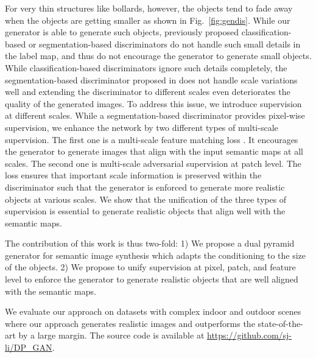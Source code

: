 \documentclass{bmvc2k}
\newcommand{\figref}[1]{Fig.~\ref{#1}}
\begin{document}
For very thin structures like bollards, however, the objects tend to fade away when the objects are getting smaller as shown in \figref{fig:gendis}. While our generator is able to generate such objects, previously proposed classification-based \cite{park2019semantic} or segmentation-based \cite{schonfeld_sushko_iclr2021} discriminators do not handle such small details in the label map, and thus do not encourage the generator to generate small objects. While classification-based discriminators ignore such details completely, the segmentation-based discriminator proposed in \cite{schonfeld_sushko_iclr2021} does not handle scale variations well and extending the discriminator to different scales even deteriorates the quality of the generated images. 
To address this issue, we introduce supervision at different scales. 
While a segmentation-based discriminator provides pixel-wise supervision, we enhance the network by two different types of multi-scale supervision. 
The first one is a multi-scale feature matching loss \cite{johnson2016perceptual}. It encourages the generator to generate images that align with the input semantic maps at all scales.
The second one is multi-scale adversarial supervision at patch level.
The loss ensures that important scale information is preserved  within the discriminator such that the generator is enforced to generate more realistic objects at various scales. 
We show that the unification of the three types of supervision is essential to generate realistic objects that align well with the semantic maps.


The contribution of this work is thus two-fold:
1) We propose a dual pyramid generator for semantic image synthesis which adapts the conditioning to the size of the objects. 
2) We propose to unify supervision at pixel, patch, and feature level to enforce the generator to generate realistic objects that are well aligned with the semantic maps.

We evaluate our approach on datasets with complex indoor and outdoor scenes where our approach generates realistic images and outperforms the state-of-the-art by a large margin. The source code is available at \href{https://github.com/sj-li/DP_GAN}{https://github.com/sj-li/DP\_GAN}.      
\end{document}
